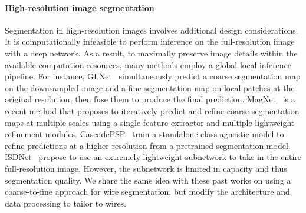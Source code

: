 \vspace{-5mm}
\paragraph{High-resolution image segmentation}
Segmentation in high-resolution images involves additional design considerations. It is computationally infeasible to perform inference on the full-resolution image with a deep network. As a result, to maximally preserve image details within the available computation resources, many methods employ a global-local inference pipeline. For instance, GLNet~\cite{glnet} simultaneously predict a coarse segmentation map on the downsampled image and a fine segmentation map on local patches at the original resolution, then fuse them to produce the final prediction. 
MagNet~\cite{magnet} is a recent method that proposes to iteratively predict and refine coarse segmentation maps at multiple scales using a single feature extractor and multiple lightweight refinement modules. CascadePSP~\cite{cascadepsp} train a standalone class-agnostic model to refine predictions at a higher resolution from a pretrained segmentation model. ISDNet~\cite{isdnet} propose to use an extremely lightweight subnetwork to take in the entire full-resolution image. However, the subnetwork is limited in capacity and thus segmentation quality. We share the same idea with these past works on using a coarse-to-fine approach for wire segmentation, but modify the architecture and data processing to tailor to wires.

\vspace{-5mm}
